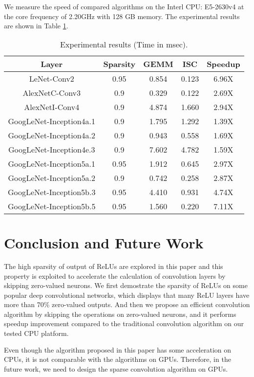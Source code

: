 \documentclass{article}
\begin{document}
We measure the speed of compared algorithms on the Interl CPU: E5-2630v4 at the core frequency of 2.20GHz with 128 GB memory. The experimental results are shown in Table \ref{table:cnnresults}.
\begin{table}[!ht]
\centering
\caption{Experimental results (Time in msec).}
\label{table:cnnresults}
\begin{tabular}{|c|c|c|c|c|}
\hline
	Layer&	 Sparsity &GEMM & ISC	&Speedup\\\cline{1-5}
\hline
\hline
LeNet-Conv2&    0.95    &0.854  &0.123  &6.96X \\\cline{1-5}
AlexNetC-Conv3& 0.9     &0.329  &0.122  &2.69X \\\cline{1-5}
AlexNetI-Conv4& 0.9     &4.874  &1.660  &2.94X \\\cline{1-5}
GoogLeNet-Inception4a.1&        0.9     &1.795  &1.292  &1.39X \\\cline{1-5}
GoogLeNet-Inception4a.2&        0.9     &0.943  &0.558  &1.69X \\\cline{1-5}
GoogLeNet-Inception4e.3&        0.9     &7.602  &4.782  &1.59X \\\cline{1-5}
GoogLeNet-Inception5a.1&        0.95    &1.912  &0.645  &2.97X \\\cline{1-5}
GoogLeNet-Inception5a.2&        0.9     &0.742  &0.258  &2.87X \\\cline{1-5}
GoogLeNet-Inception5b.3&        0.95    &4.410  &0.931  &4.74X \\\cline{1-5}
GoogLeNet-Inception5b.5&        0.95    &1.560  &0.220  &7.11X \\\cline{1-5}
\end{tabular}
\end{table}

\section{Conclusion and Future Work}
The high sparsity of output of ReLUs are explored in this paper and this property is exploited to accelerate the calculation of convolution layers by skipping zero-valued neurons. We first demostrate the sparsity of ReLUs on some popular deep convolutional networks, which displays that many ReLU layers have more than 70\% zero-valued outputs. And then we propose an efficient convolution algorithm by skipping the operations on zero-valued neurons, and it performs speedup improvement compared to the traditional convolution algorithm on our tested CPU platform.

Even though the algorithm proposed in this paper has some acceleration on CPUs, it is not comparable with the algorithms on GPUs. Therefore, in the future work, we need to design the sparse convolution algorithm on GPUs. 



\end{document}

